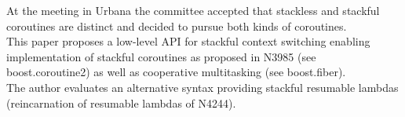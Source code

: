 At the meeting in Urbana the committee accepted that stackless and stackful
coroutines are distinct and decided to pursue both kinds of coroutines.\\
This paper proposes a low-level API for stackful context switching enabling
implementation of stackful coroutines as proposed in N3985 (see
boost.coroutine2\cite{bcoroutine2}) as well as cooperative multitasking (see
boost.fiber\cite{bfiber}).\\
The author evaluates an alternative syntax providing stackful resumable lambdas
(reincarnation of resumable lambdas of N4244).
